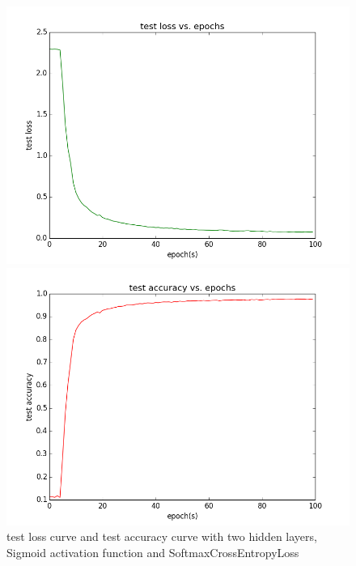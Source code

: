 \documentclass{elegantbook}
\begin{document}
\begin{figure}[!ht]
	\centering
	\begin{minipage}[t]{0.45\textwidth}
		\centering
		\includegraphics[width=\textwidth]{testloss2ss}
	\end{minipage}
	\begin{minipage}[t]{0.45\textwidth}
		\centering
		\includegraphics[width=\textwidth]{testacc2ss}
	\end{minipage}
	\caption{\label{testcurve24}test loss curve and test accuracy curve with two hidden layers, Sigmoid activation function and SoftmaxCrossEntropyLoss}
\end{figure}
\end{document}
